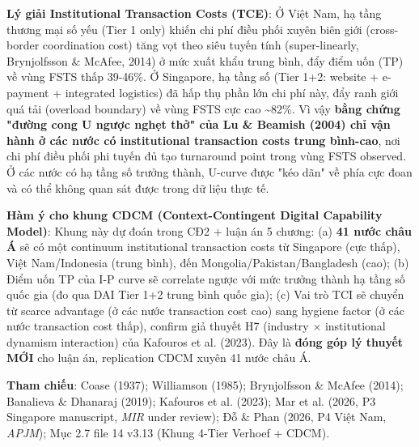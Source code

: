\documentclass[12pt,a4paper]{article}
\begin{document}
\textbf{Lý giải Institutional Transaction Costs (TCE)}: Ở Việt Nam, hạ
tầng thương mại số yếu (Tier 1 only) khiến chi phí điều phối xuyên biên
giới (cross-border coordination cost) tăng vọt theo siêu tuyến tính
(super-linearly, Brynjolfsson \& McAfee, 2014) ở mức xuất khẩu trung
bình, đẩy điểm uốn (TP) về vùng FSTS thấp 39-46\%. Ở Singapore, hạ tầng
số (Tier 1+2: website + e-payment + integrated logistics) đã hấp thụ
phần lớn chi phí này, đẩy ranh giới quá tải (overload boundary) về vùng
FSTS cực cao \textasciitilde82\%. Vì vậy \textbf{bằng chứng "đường cong
U ngược nghẹt thở" của Lu \& Beamish (2004) chỉ vận hành ở các nước có
institutional transaction costs trung bình-cao}, nơi chi phí điều phối
phi tuyến đủ tạo turnaround point trong vùng FSTS observed. Ở các nước
có hạ tầng số trưởng thành, U-curve được "kéo dãn" về phía cực đoan và
có thể không quan sát được trong dữ liệu thực tế.

\textbf{Hàm ý cho khung CDCM (Context-Contingent Digital Capability
Model)}: Khung này dự đoán trong CĐ2 + luận án 5 chương: (a) \textbf{41
nước châu Á} sẽ có một continuum institutional transaction costs từ
Singapore (cực thấp), Việt Nam/Indonesia (trung bình), đến
Mongolia/Pakistan/Bangladesh (cao); (b) Điểm uốn TP của I-P curve sẽ
correlate ngược với mức trưởng thành hạ tầng số quốc gia (đo qua DAI
Tier 1+2 trung bình quốc gia); (c) Vai trò TCI sẽ chuyển từ scarce
advantage (ở các nước transaction cost cao) sang hygiene factor (ở các
nước transaction cost thấp), confirm giả thuyết H7 (industry ×
institutional dynamism interaction) của Kafouros et al. (2023). Đây là
\textbf{đóng góp lý thuyết MỚI} cho luận án, replication CDCM xuyên 41
nước châu Á.

\textbf{Tham chiếu}: Coase (1937); Williamson (1985); Brynjolfsson \&
McAfee (2014); Banalieva \& Dhanaraj (2019); Kafouros et al. (2023); Mar
et al. (2026, P3 Singapore manuscript, \emph{MIR} under review); Đỗ \&
Phan (2026, P4 Việt Nam, \emph{APJM}); Mục 2.7 file 14 v3.13 (Khung
4-Tier Verhoef + CDCM).
\end{document}
